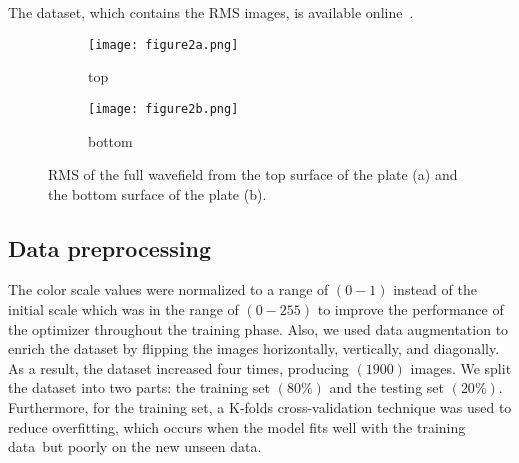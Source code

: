 \documentclass[runningheads]{llncs}
\begin{document}
The dataset, which contains the RMS images, is available online~\cite{Kudela2020d}.
\begin{figure} [h!]
	\centering
	\begin{subfigure}[b]{0.47\textwidth}
		\centering
		\texttt{[image: figure2a.png]}
		\caption{top}
		\label{fig:rmstop}
	\end{subfigure}
	\hfill
	\begin{subfigure}[b]{0.47\textwidth}
		\centering
		\texttt{[image: figure2b.png]}
		\caption{bottom}
		\label{fig:rmsbottom}
	\end{subfigure}
	\caption{RMS of the full wavefield from the top surface of the plate (a) and the bottom surface of the plate (b).}
	\label{fig:rms}
\end{figure} 
\subsection{Data preprocessing}
The color scale values were normalized to a range of \((0-1)\) instead of the initial scale which was in the range of \((0 - 255)\) to improve the performance of the optimizer throughout the training phase.
Also, we used data augmentation to enrich the dataset by flipping the images horizontally, vertically, and diagonally.
As a result, the dataset increased four times, producing \((1900)\) images.
We split the dataset into two parts: the training set \((80\%)\) and the testing set \((20\%)\).
Furthermore, for the training set, a K-folds cross-validation technique was used to reduce overfitting, which occurs when the model fits well with the training data but poorly on the new unseen data.
\end{document}
